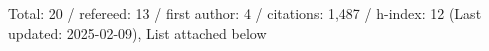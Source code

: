 Total: 20 / refereed: 13 / first author: 4 / citations: 1,487 / h-index: 12 (Last updated: 2025-02-09), List attached below
